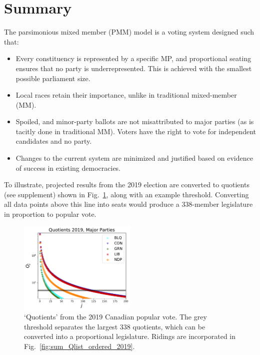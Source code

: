 \section*{Summary}
\renewcommand{\thefigure}{S-\arabic{figure}}

The parsimonious mixed member (PMM) model is a voting system designed such that:

\begin{itemize}
\item Every constituency is represented by a specific MP, and proportional seating ensures that no party is underrepresented. This is achieved with the smallest possible parliament size. 
\item Local races retain their importance, unlike in traditional mixed-member (MM).
\item Spoiled, and minor-party ballots are not misattributed to major parties (as is tacitly done in traditional MM). Voters have the right to vote for independent candidates and no party.
\item Changes to the current system are minimized and justified based on evidence of success in existing democracies.
\end{itemize}

To illustrate, projected results from the 2019 election are converted to quotients (see supplement) shown in Fig.~\ref{fig:sum_Qlist_byparty_2019}, along with an example threshold. Converting all data points above this line into seats would produce a 338-member legislature in proportion to popular vote. 
\begin{figure}[h!]
  \includegraphics[width=0.50\textwidth,clip]{PR_calcs/data/raw_2019/PMM_out/PMM_Qlist_byparty.pdf}
  \caption{`Quotients' from the 2019 Canadian popular vote. The grey threshold separates the largest 338 quotients, which can be converted into a proportional legislature. Ridings are incorporated in Fig.~\ref{fig:sum_Qlist_ordered_2019}. }
\label{fig:sum_Qlist_byparty_2019}
\end{figure}

